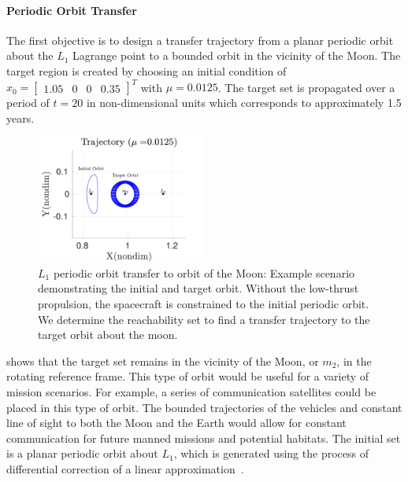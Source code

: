 \paragraph{Periodic Orbit Transfer}\label{sec:periodic_orbit_transfer}
The first objective is to design a transfer trajectory from a planar periodic orbit about the \( L_1\) Lagrange point to a bounded orbit in the vicinity of the Moon.
The target region is created by choosing an initial condition of \( x_0 = \begin{bmatrix}1.05 & 0 & 0 & 0.35 \end{bmatrix}^T \) with \( \mu = 0.0125 \).
The target set is propagated over a period of \( t = \num{20} \) in non-dimensional units which corresponds to approximately \num{1.5} years.
\begin{figure}[htbp]
   \centering
   \includegraphics[width=0.5\textwidth]{figures/2017_JAS/moon_orbit.pdf} %
   \caption{\(L_1\) periodic orbit transfer to orbit of the Moon: Example scenario demonstrating the initial and target orbit.
   Without the low-thrust propulsion, the spacecraft is constrained to the initial periodic orbit. 
   We determine the reachability set to find a transfer trajectory to the target orbit about the moon.}
   \label{fig:moon_orbit}
\end{figure}
 shows that the target set remains in the vicinity of the Moon, or \( m_2\), in the rotating reference frame. 
This type of orbit would be useful for a variety of mission scenarios.
For example, a series of communication satellites could be placed in this type of orbit. 
The bounded trajectories of the vehicles and constant line of sight to both the Moon and the Earth would allow for constant communication for future manned missions and potential habitats.
The initial set is a planar periodic orbit about \( L_1\), which is generated using the process of differential correction of a linear approximation~\cite{koon2011}.

